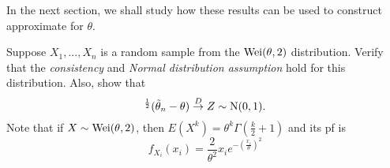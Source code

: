 \documentclass[notoc,notitlepage]{tufte-book}
\newcommand{\convd}{\overset{D}{\to}}
\begin{document}
In the next section, we shall study how these results can be used to construct approximate  for $\theta$.

\begin{eg}
  Suppose $X_1, ..., X_n$ is a random sample from the $\operatorname{Wei}(\theta, 2)$ distribution. Verify that the \textit{consistency} and \textit{Normal distribution assumption} hold for this distribution. Also, show that
  \begin{equation*}
    [ I(\tilde{\theta}_n; X) ]^{\frac{1}{2}} ( \tilde{\theta}_n - \theta ) \convd Z \sim \Nor(0, 1).
  \end{equation*}
  Note that if $X \sim \operatorname{Wei}(\theta, 2)$, then $E(X^k) = \theta^k \Gamma\left( \frac{k}{2} + 1 \right)$ and its pf is
  \begin{equation*}
    f_{X_i}(x_i) = \frac{2}{\theta^2} x_i e^{- \left( \frac{x_i}{\theta} \right)^2}
  \end{equation*}
\end{eg}
\end{document}
